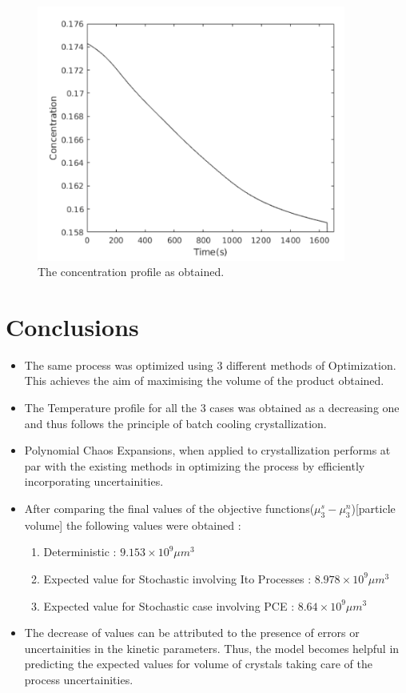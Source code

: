 \begin{figure}[h!] 

\begin{center}
\includegraphics[width=4in]{PCEConc.png}
\end{center}
\caption{The concentration profile as obtained.}
\end{figure}
\clearpage

\section{Conclusions}
\begin{itemize}
\item The same process was optimized using 3 different methods of Optimization. This achieves the aim of maximising the volume of the product obtained. 
\item The Temperature profile for all the 3 cases was obtained as a decreasing one and thus follows the principle of batch cooling crystallization. 
\item Polynomial Chaos Expansions, when applied to crystallization performs at par with the existing methods in optimizing the process by efficiently incorporating uncertainities. 
\item After comparing the final values of the objective functions($\mu_{3}^{s}-\mu_{3}^{n}$)[particle volume] the following values were obtained : 
\begin{enumerate}
\item Deterministic : $ 9.153 \times 10^{9} \mu m^{3}$
\item Expected value for Stochastic involving Ito Processes : $8.978 \times 10^{9} \mu m^{3}$
\item Expected value for Stochastic case involving PCE : $8.64 \times 10^{9} \mu m^{3}$
\end{enumerate}
\item The decrease of values can be attributed to the presence of errors or uncertainities in the kinetic parameters. Thus, the model becomes helpful in predicting the expected values for volume of crystals taking care of the process uncertainities.
\end{itemize}
